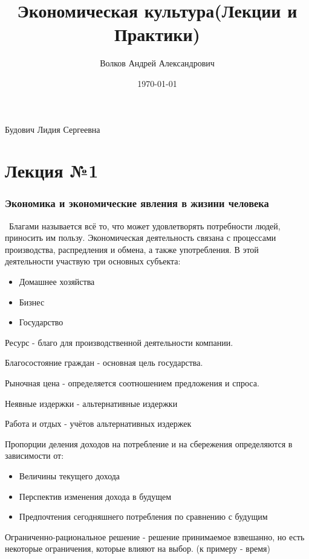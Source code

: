 \documentclass[a4paper, 12pt]{article}
\author{Волков Андрей Александрович}
\title{Экономическая культура(Лекции и Практики)}
\date{\today}
\begin{document}
	\newcommand{\imagenocap}[2]{
		\begin{figure}[!htb]
			\centering
			\texttt{[image: \#1]}
			\centering
			\caption*{#2}
		\end{figure}
		\newpage
	}
	\maketitle
	Будович Лидия Сергеевна
	
	\part*{Лекция №1}
	
	\section{Экономика и экономические явления в жизини человека}
	
	\quad \, Благами называется всё то, что может удовлетворять потребности людей, приносить им пользу. Экономическая деятельность связана с процессами производства, распредления и обмена, а также употребления. В этой деятельности участвую три основных субъекта:
	\begin{itemize}
		\item Домашнее хозяйства
		\item Бизнес
		\item Государство
	\end{itemize}

	Ресурс - благо для производственной деятельности компании.
	
	Благосостояние граждан - основная цель государства.
	
	Рыночная цена - определяется соотношением предложения и спроса.
	
	Неявные издержки - альтернативные издержки
	
	Работа и отдых - учётов альтернативных издержек
	
	Пропорции деления доходов на потребление и на сбережения определяются в зависимости от:
	\begin{itemize}
		\item Величины текущего дохода
		\item Перспектив изменения дохода в будущем
		\item Предпочтения сегодняшнего потребления по сравнению с будущим
	\end{itemize}

	Ограниченно-рациональное решение - решение принимаемое взвешанно, но есть некоторые ограничения, которые влияют на выбор. (к примеру - время)
\end{document}
